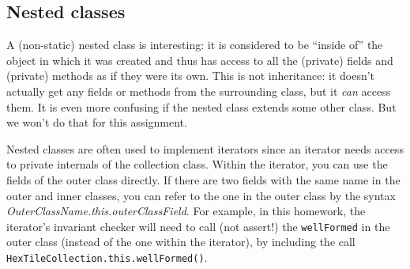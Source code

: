 \documentclass[11pt]{article}
\begin{document}
\subsection{Nested classes}

A (non-static)
nested class is interesting: it is considered to be ``inside of'' the
object in which it was created and thus has access to all the
(private) fields and (private) methods as if they were its own.
This is not inheritance: it doesn't actually get any fields or methods
from the surrounding class, but it \emph{can} access them.
It is even more confusing if the nested class extends some other
class.  But we won't do that for this assignment.

Nested classes are often used to implement iterators since an iterator
needs access to private internals of the collection class.
Within the iterator, you can use the fields of the outer class directly.
If there are two fields with the same name in the outer and inner classes,
you can refer to the one in the outer class by the syntax 
\emph{OuterClassName.this.outerClassField}.
For example, in this homework, the iterator's invariant checker will
need to call (not assert!) the \verb|wellFormed| in the outer class
(instead of the one within the iterator), by including the call
\verb|HexTileCollection.this.wellFormed()|.

%
\end{document}
